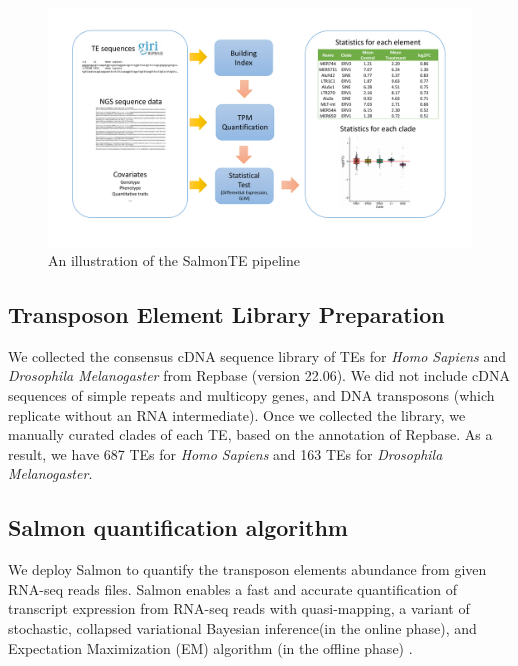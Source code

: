 \documentclass{ws-procs11x85}
\begin{document}
\begin{figure}[!ht]
\centerline{
\includegraphics[width=16cm]{fig1.pdf}
}
\caption{An illustration of the SalmonTE pipeline}
\label{aba:fig1}
\end{figure}

\subsection{Transposon Element Library Preparation}

We collected the consensus cDNA sequence library of TEs for \textit{Homo Sapiens} and \textit{Drosophila Melanogaster} from Repbase  
(version 22.06)\cite{repbase}. We did not include cDNA sequences of simple repeats and multicopy genes, and DNA transposons (which replicate without an RNA intermediate). 
Once we collected the library, we manually curated clades of each TE, based on the annotation of Repbase. As a result, we have 687 TEs for \textit{Homo Sapiens} and 163 TEs for \textit{Drosophila Melanogaster}.

\subsection{Salmon quantification algorithm}

We deploy Salmon\cite{patro2017salmon} to quantify the transposon elements abundance from given RNA-seq reads files. Salmon enables a fast and accurate quantification of transcript expression from RNA-seq reads with quasi-mapping, a variant of stochastic, collapsed variational Bayesian inference(in the online phase), and Expectation Maximization (EM) algorithm (in the offline phase)
\cite{patro2017salmon,srivastava2016rapmap,bishop2006pattern,foulds2013stochastic}. 
\end{document}
